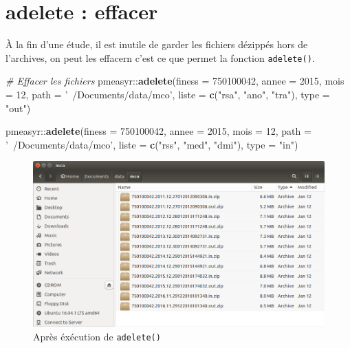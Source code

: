 \documentclass[]{book}
\newenvironment{Shaded}{\begin{snugshade}}{\end{snugshade}}
\newcommand{\KeywordTok}[1]{\textcolor[rgb]{0.13,0.29,0.53}{\textbf{{#1}}}}
\newcommand{\DataTypeTok}[1]{\textcolor[rgb]{0.13,0.29,0.53}{{#1}}}
\newcommand{\DecValTok}[1]{\textcolor[rgb]{0.00,0.00,0.81}{{#1}}}
\newcommand{\StringTok}[1]{\textcolor[rgb]{0.31,0.60,0.02}{{#1}}}
\newcommand{\CommentTok}[1]{\textcolor[rgb]{0.56,0.35,0.01}{\textit{{#1}}}}
\newcommand{\NormalTok}[1]{{#1}}
\begin{document}
\section{adelete : effacer}\label{adelete-effacer}

À la fin d'une étude, il est inutile de garder les fichiers dézippés
hors de l'archives, on peut les effacern c'est ce que permet la fonction
\texttt{adelete()}.

\begin{Shaded}
\begin{Highlighting}[]
\CommentTok{# Effacer les fichiers}
\NormalTok{pmeasyr::}\KeywordTok{adelete}\NormalTok{(}\DataTypeTok{finess =} \DecValTok{750100042}\NormalTok{, }
                 \DataTypeTok{annee =} \DecValTok{2015}\NormalTok{, }
                 \DataTypeTok{mois =} \DecValTok{12}\NormalTok{, }
                 \DataTypeTok{path =} \StringTok{'~/Documents/data/mco'}\NormalTok{, }
                 \DataTypeTok{liste =} \KeywordTok{c}\NormalTok{(}\StringTok{"rsa"}\NormalTok{, }\StringTok{"ano"}\NormalTok{, }\StringTok{"tra"}\NormalTok{), }
                 \DataTypeTok{type =} \StringTok{"out"}\NormalTok{)}

\NormalTok{pmeasyr::}\KeywordTok{adelete}\NormalTok{(}\DataTypeTok{finess =} \DecValTok{750100042}\NormalTok{, }
                 \DataTypeTok{annee =} \DecValTok{2015}\NormalTok{, }
                 \DataTypeTok{mois =} \DecValTok{12}\NormalTok{, }
                 \DataTypeTok{path =} \StringTok{'~/Documents/data/mco'}\NormalTok{, }
                 \DataTypeTok{liste =} \KeywordTok{c}\NormalTok{(}\StringTok{"rss"}\NormalTok{, }\StringTok{"med"}\NormalTok{, }\StringTok{"dmi"}\NormalTok{), }
                 \DataTypeTok{type =} \StringTok{"in"}\NormalTok{)}
\end{Highlighting}
\end{Shaded}

\begin{figure}[htbp]
\centering
\includegraphics{images/archives_mco.png}
\caption{Après éxécution de \texttt{adelete()}}
\end{figure}
\end{document}
